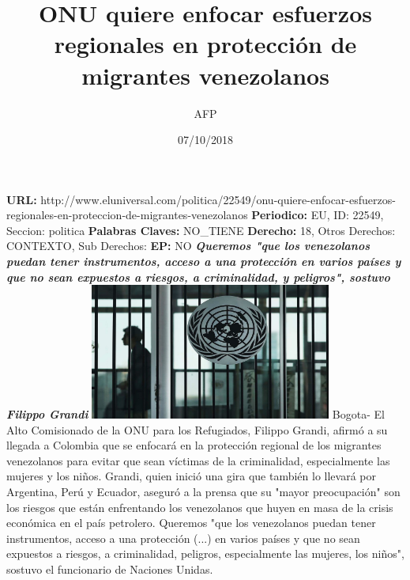 \documentclass{article}%
\title{\textbf{ONU quiere enfocar esfuerzos regionales en protección de migrantes venezolanos}}%
\author{AFP}%
\date{07/10/2018}%
\begin{document}
%
\normalsize%
\maketitle%
\textbf{URL: }%
http://www.eluniversal.com/politica/22549/onu{-}quiere{-}enfocar{-}esfuerzos{-}regionales{-}en{-}proteccion{-}de{-}migrantes{-}venezolanos\newline%
%
\textbf{Periodico: }%
EU, %
ID: %
22549, %
Seccion: %
politica\newline%
%
\textbf{Palabras Claves: }%
NO\_TIENE\newline%
%
\textbf{Derecho: }%
18, %
Otros Derechos: %
CONTEXTO, %
Sub Derechos: %
\newline%
%
\textbf{EP: }%
NO\newline%
\newline%
%
\textbf{\textit{Queremos "que los venezolanos puedan tener instrumentos, acceso a una protección en varios países y que no sean expuestos a riesgos, a criminalidad, y peligros", sostuvo Filippo Grandi}}%
\newline%
\newline%
%
\includegraphics[width=300px]{96.jpg}%
\newline%
%
Bogota{-} El Alto Comisionado de la ONU para los Refugiados, Filippo Grandi, afirmó a su llegada a Colombia que se enfocará en la protección regional de los migrantes venezolanos para evitar que sean víctimas de la criminalidad, especialmente las mujeres y los niños.%
\newline%
%
Grandi, quien inició una gira que también lo llevará por Argentina, Perú y Ecuador, aseguró a la prensa que su "mayor preocupación" son los riesgos que están enfrentando los venezolanos que huyen en masa de la crisis económica en el país petrolero.%
\newline%
%
Queremos "que los venezolanos puedan tener instrumentos, acceso a una protección (...) en varios países y que no sean expuestos a riesgos, a criminalidad, peligros, especialmente las mujeres, los niños", sostuvo el funcionario de Naciones Unidas.%
\newline%
\end{document}
